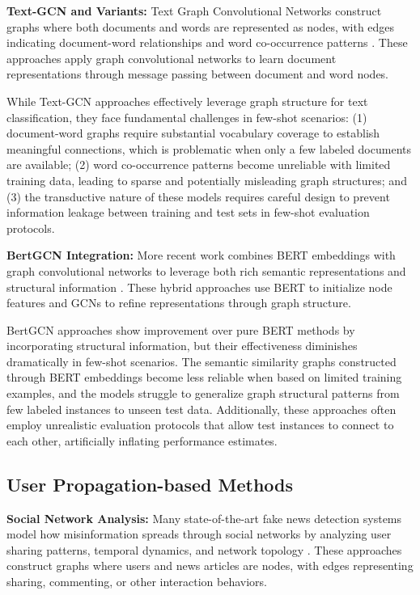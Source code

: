 \textbf{Text-GCN and Variants:} Text Graph Convolutional Networks construct graphs where both documents and words are represented as nodes, with edges indicating document-word relationships and word co-occurrence patterns \cite{yao2019graph, liu2020early}. These approaches apply graph convolutional networks to learn document representations through message passing between document and word nodes.

While Text-GCN approaches effectively leverage graph structure for text classification, they face fundamental challenges in few-shot scenarios: (1) document-word graphs require substantial vocabulary coverage to establish meaningful connections, which is problematic when only a few labeled documents are available; (2) word co-occurrence patterns become unreliable with limited training data, leading to sparse and potentially misleading graph structures; and (3) the transductive nature of these models requires careful design to prevent information leakage between training and test sets in few-shot evaluation protocols.

\textbf{BertGCN Integration:} More recent work combines BERT embeddings with graph convolutional networks to leverage both rich semantic representations and structural information \cite{lin2021bertgcn}. These hybrid approaches use BERT to initialize node features and GCNs to refine representations through graph structure.

BertGCN approaches show improvement over pure BERT methods by incorporating structural information, but their effectiveness diminishes dramatically in few-shot scenarios. The semantic similarity graphs constructed through BERT embeddings become less reliable when based on limited training examples, and the models struggle to generalize graph structural patterns from few labeled instances to unseen test data. Additionally, these approaches often employ unrealistic evaluation protocols that allow test instances to connect to each other, artificially inflating performance estimates.

\subsection{User Propagation-based Methods}

\textbf{Social Network Analysis:} Many state-of-the-art fake news detection systems model how misinformation spreads through social networks by analyzing user sharing patterns, temporal dynamics, and network topology \cite{shu2017fake, zhou2020survey}. These approaches construct graphs where users and news articles are nodes, with edges representing sharing, commenting, or other interaction behaviors.

